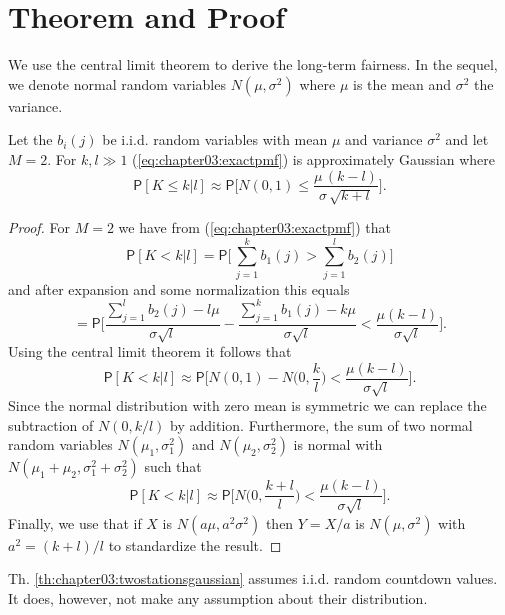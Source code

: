 \section{Theorem and Proof}
\label{sec:chapter03:theorem}
We use the central limit theorem to derive the long-term fairness. In the sequel, we denote normal random variables $N(\mu,\sigma^2)$ where $\mu$ is the mean and $\sigma^2$ the variance.
%
\begin{Theorem}
\label{th:chapter03:twostationsgaussian}
%
Let the $b_i(j)$ be i.i.d. random variables with mean $\mu$ and variance $\sigma^2$ and let $M=2$. For $k,l \gg 1$ (\ref{eq:chapter03:exactpmf}) is approximately Gaussian where
%
\begin{equation*}
\mathsf{P}[K \!\le\! k|l] \approx \mathsf{P}\biggl[ N(0,1) \le \frac{\mu\,(k-l)}{\sigma\,\sqrt{k+l}} \biggr] .
\end{equation*}
%
\end{Theorem}
%
\begin{proof}
%
For $M=2$ we have from (\ref{eq:chapter03:exactpmf}) that
%
\begin{equation*}
\mathsf{P}[K \!<\! k|l] = \mathsf{P} \Biggl[\, \sum_{j=1}^k b_1(j) > \sum_{j=1}^l b_2(j) \Biggr]
\end{equation*}
%
and after expansion and some normalization this equals
%
\begin{equation*}
= \mathsf{P}\Biggl[ \frac{\sum_{j=1}^{l}b_2(j) - l\mu}{\sigma\sqrt{l}} - \frac{\sum_{j=1}^{k}b_1(j) - k\mu}{\sigma\sqrt{l}} < \frac{\mu(k-l)}{\sigma\sqrt{l}} \Biggr].
\end{equation*}
%
Using the central limit theorem it follows that
%
\begin{equation*}
\mathsf{P}[K \!<\! k|l] \approx \mathsf{P} \biggl[ N(0,1) - N \biggl(0,\frac{k}{l}\biggr) < \frac{\mu(k-l)}{\sigma\sqrt{l}} \biggr] .
\end{equation*}
%
Since the normal distribution with zero mean is symmetric we can replace the subtraction of $N(0,k/l)$ by addition. Furthermore, the sum of two normal random variables $N(\mu_1, \sigma_1^2)$ and $N(\mu_2, \sigma_2^2)$ is normal with $N(\mu_1+\mu_2, \sigma_1^2+ \sigma_2^2)$ such that
%
\begin{equation*}
\mathsf{P}[K \!<\! k|l] \approx \mathsf{P} \biggl[ N\biggl(0,\frac{k+l}{l}\biggr) < \frac{\mu(k-l)}{\sigma\sqrt{l}} \biggr] .
\end{equation*}
%
Finally, we use that if $X$ is $N(a\mu,a^2\sigma^2)$ then $Y = X/a$ is $N(\mu,\sigma^2)$ with $a^2 = (k+l)/l$ to standardize the result.
%
\end{proof}

Th. \ref{th:chapter03:twostationsgaussian} assumes i.i.d. random countdown values. It does, however, not make any assumption about their distribution.
